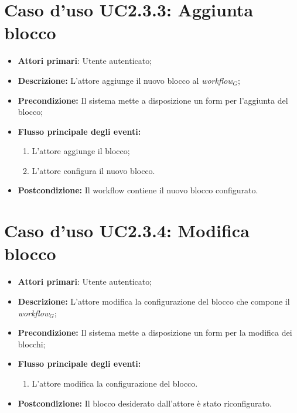 \section{Caso d'uso UC2.3.3: Aggiunta blocco }
\begin{itemize}
	\item \textbf{Attori primari}: Utente autenticato;
	\item \textbf{Descrizione:} L'attore aggiunge il nuovo blocco al \textit{workflow$_{G}$};
	\item \textbf{Precondizione:} Il sistema mette a disposizione un form per l'aggiunta del blocco;
	\item \textbf{Flusso principale degli eventi:}
	\begin{enumerate}
		\item L'attore aggiunge il blocco;
		\item L'attore configura il nuovo blocco.
	\end{enumerate}
	\item \textbf{Postcondizione:} Il workflow contiene il nuovo blocco configurato.
\end{itemize}
\section{Caso d'uso UC2.3.4: Modifica blocco }
\begin{itemize}
	\item \textbf{Attori primari}: Utente autenticato;
	\item \textbf{Descrizione:} L'attore modifica la configurazione del blocco che compone il \textit{workflow$_{G}$};
	\item \textbf{Precondizione:} Il sistema mette a disposizione un form per la modifica dei blocchi;
	\item \textbf{Flusso principale degli eventi:}
	\begin{enumerate}
		\item L'attore modifica la configurazione del blocco.
	\end{enumerate}
	\item \textbf{Postcondizione:} Il blocco desiderato dall'attore è stato riconfigurato.
\end{itemize}
